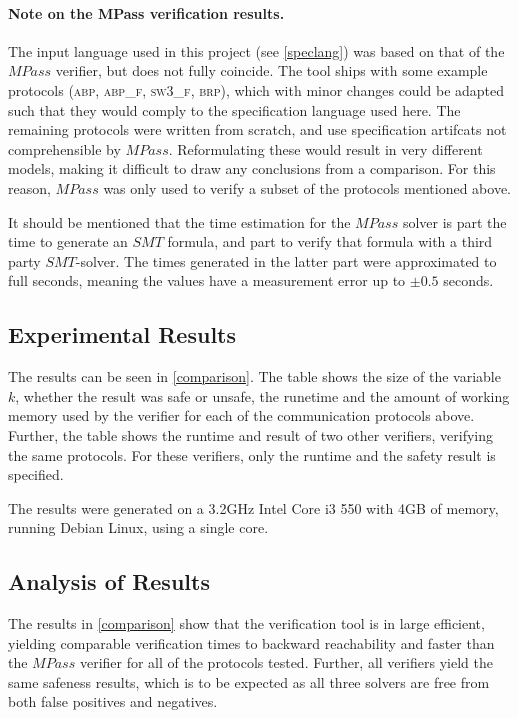 \paragraph{Note on the MPass verification results.}
The input language used in this project (see \ref{speclang}) was based on that of the $MPass$ verifier, but does not fully coincide. The tool ships with some example protocols (\textsc{abp, abp\_f, sw3\_f, brp}), which with minor changes could be adapted such that they would comply to the specification language used here. The remaining protocols were written from scratch, and use specification artifcats not comprehensible by $MPass$. Reformulating these would result in very different models, making it difficult to draw any conclusions from a comparison. For this reason, $MPass$ was only used to verify a subset of the protocols mentioned above.

It should be mentioned that the time estimation for the $MPass$ solver is part the time to generate an $SMT$ formula, and part to verify that formula with a third party $SMT$-solver. The times generated in the latter part were approximated to full seconds, meaning the values have a measurement error up to $\pm 0.5$ seconds.

\subsection{Experimental Results}
The results can be seen in \ref{comparison}. The table shows the size of the variable $k$, whether the result was safe or unsafe, the runetime and the amount of working memory used by the verifier for each of the communication protocols above. Further, the table shows the runtime and result of two other verifiers, verifying the same protocols. For these verifiers, only the runtime and the safety result is specified.

The results were generated on a 3.2GHz Intel Core i3 550 with 4GB of memory, running Debian Linux, using a single core.

\subsection{Analysis of Results}
The results in \ref{comparison} show that the verification tool is in large efficient, yielding comparable verification times to backward reachability and faster than the $MPass$ verifier for all of the protocols tested. Further, all verifiers yield the same safeness results, which is to be expected as all three solvers are free from both false positives and negatives.

